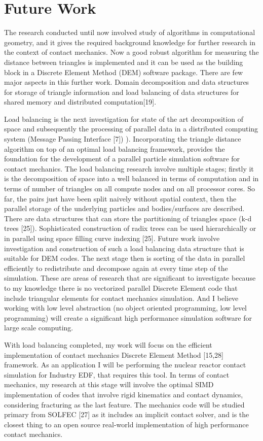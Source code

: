\documentclass[times,12pt]{ACME2015article}
\begin{document}
\section{Future Work}
The research conducted until now involved study of algorithms in computational geometry, and it gives the required background knowledge for further research in the context of contact mechanics. Now a good robust algorithm for measuring the distance between triangles is implemented and it can be used as the building block in a Discrete Element Method (DEM) software package. There are few major aspects in this further work. Domain decomposition and data structures for storage of triangle information and load balancing of data structures for shared memory and distributed computation[19].

Load balancing is the next investigation for state of the art decomposition of space and subsequently the processing of parallel data in a distributed computing system (Message Passing Interface [7]) ). Incorporating the triangle distance algorithm on top of an optimal load balancing framework, provides the foundation for the development of a parallel particle simulation software for contact mechanics. The load balancing research involve multiple stages; firstly it is the decomposition of space into a well balanced in terms of computation and in terms of number of triangles on all compute nodes and on all processor cores. So far, the pairs just have been split naively without spatial context, then the parallel storage of the underlying particles and bodies/surfaces  are described. There are data structures that can store the partitioning of triangles space (k-d trees [25]). Sophisticated construction of radix trees can be used hierarchically or in parallel using space filling curve indexing [25]. Future work involve investigation and construction of such a load balancing data structure that is suitable for DEM codes. The next stage then is sorting of the data in parallel efficiently to redistribute and decompose again at every time step of the simulation. These are areas of research that are significant to investigate because to my knowledge there is no vectorized parallel Discrete Element code that include triangular elements for contact mechanics simulation. And I believe working with low level abstraction (no object oriented programming, low level programming) will create a significant high performance simulation software for large scale computing. 

With load balancing completed, my work will focus on the efficient implementation of contact mechanics Discrete Element Method [15,28] framework. As an application I will be performing the nuclear reactor contact simulation for Industry EDF, that requires this tool. In terms of contact mechanics, my research at this stage will involve the optimal SIMD implementation of codes that involve rigid kinematics and contact dynamics, considering fracturing as the last feature. The mechanics code will be studied primary from SOLFEC [27] as it includes an implicit contact solver, and is the closest thing to an open source real-world implementation of high performance contact mechanics.
\end{document}
